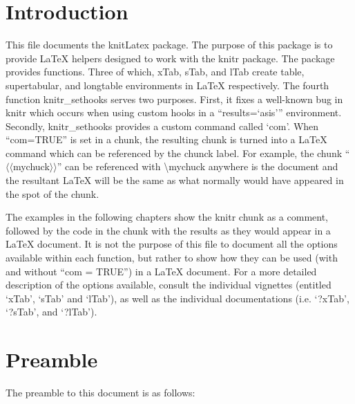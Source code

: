 \documentclass{report}\usepackage[]{graphicx}\usepackage[]{color}
\begin{document}
\tableofcontents

\chapter{Introduction}

This file documents the knitLatex package. The purpose of this package is to
provide \LaTeX{} helpers designed to work with the knitr package. The package
provides functions. Three of which, xTab, sTab, and lTab create table,
supertabular, and longtable environments in LaTeX respectively. The fourth
function knitr\_sethooks serves two purposes. First, it fixes a well-known bug
in knitr which occurs when using custom hooks in a ``results=`asis''' environment.
Secondly, knitr\_sethooks provides a custom command called `com'. When
``com=TRUE'' is set in a chunk, the resulting chunk is turned into a \LaTeX{}
command which can be referenced by the chunck label. For example, the chunk
``$\langle\langle$mychuck$\rangle\rangle$'' can be referenced with
\textbackslash{}mychuck anywhere is the document and the resultant \LaTeX{} will
be the same as what normally would have appeared in the spot of the chunk.

The examples in the following chapters show the knitr chunk as a comment,
followed by the code in the chunk with the results as they would appear in a
\LaTeX{} document. It is not the purpose of this file to document all the
options available within each function, but rather to show how they can be used
(with and without ``com = TRUE'') in a \LaTeX{} document. For a more detailed
description of the options available, consult the individual vignettes (entitled
  `xTab', `sTab' and `lTab'), as well as the individual
  documentations (i.e. `?xTab', `?sTab', and `?lTab').

\chapter{Preamble}

The preamble to this document is as follows:\\
\end{document}
